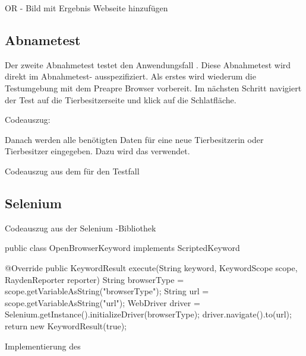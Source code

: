 \todo OR - Bild mit Ergebnis Webseite hinzufügen


\subsection{Abnametest }
\label{cha:TestenUA2}

Der zweite Abnahmetest testet den Anwendungsfall . Diese Abnahmetest wird direkt im Abnahmetest- ausspezifiziert. Als erstes wird wiederum die Testumgebung mit dem  {Preapre Browser} vorbereit. Im nächsten Schritt navigiert der Test auf die Tierbesitzerseite und klick auf die  Schlatfläche. 

\begin{program}

\caption{Codeauszug: }
\label{prog:uatest-create}
\end{program}

\SuperPar
Danach werden alle benötigten Daten für eine neue Tierbesitzerin oder Tierbesitzer eingegeben. Dazu wird das   verwendet. 

\begin{program}

\caption{Codeauszug aus dem  für den Testfall }
\label{prog:or-create}
\end{program}

\todo

\clearpage

\subsection{Selenium }
\label{cha:TestenSelenium}

\begin{program}

\caption{Codeauszug aus der Selenium -Bibliothek}
\label{prog:selenium}
\end{program}


\begin{program}
\begin{JavaCode}
public class OpenBrowserKeyword implements ScriptedKeyword {

	@Override
	public KeywordResult execute(String keyword, KeywordScope scope, RaydenReporter reporter) {
		String browserType = scope.getVariableAsString("browserType");
		String url = scope.getVariableAsString("url");
		WebDriver driver = Selenium.getInstance().initializeDriver(browserType);
		driver.navigate().to(url);
		return new KeywordResult(true);
	}
}
\end{JavaCode}
\caption{Implementierung des }
\label{prog:openBrowserKeyword}
\end{program}



